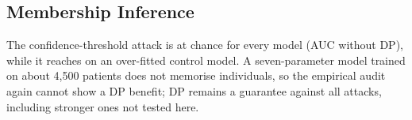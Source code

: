 \subsection{Membership Inference}
The confidence-threshold attack is at chance for every model (AUC \pMiaNoDP{} without DP), while it reaches \pMiaCtl{} on an over-fitted control model. A seven-parameter model trained on about 4{,}500 patients does not memorise individuals, so the empirical audit again cannot show a DP benefit; DP remains a guarantee against all attacks, including stronger ones not tested here.
